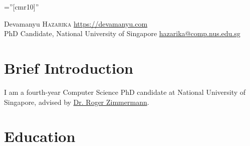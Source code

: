 \documentclass[a4paper,9pt]{article}
\begin{document}

\pagestyle{empty} %

\font\fb=''[cmr10]'' %

\par{
	{\Huge Devamanyu \textsc{Hazarika}
	}\hfill \href{https://devamanyu.com}{https://devamanyu.com} \\ 
	PhD Candidate, National University of Singapore \hfill \href{mailto:hazarika@comp.nus.edu.sg}{hazarika@comp.nus.edu.sg}
	\bigskip
\par}



\section{Brief Introduction}

I am a fourth-year Computer Science PhD candidate at National University of Singapore, advised by \href{https://www.comp.nus.edu.sg/~rogerz/roger.html}{Dr. Roger Zimmermann}.

\section{Education}
\end{document}

